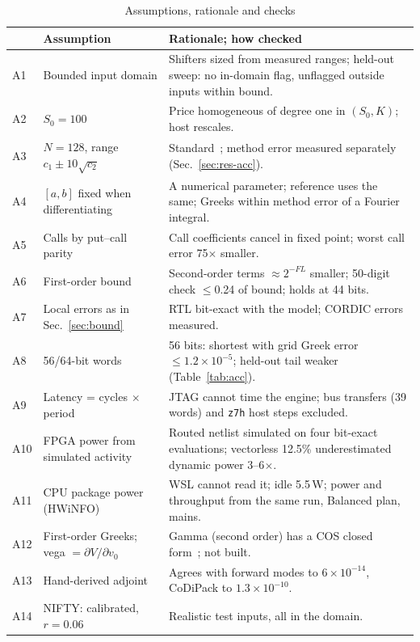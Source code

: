 \documentclass[conference]{IEEEtran}
\begin{document}
\begin{table}[!t]
\centering
\caption{Assumptions, rationale and checks}
\label{tab:assumptions}
\scriptsize
\setlength{\tabcolsep}{2pt}
\begin{tabular}{@{}L{0.42cm}L{2.55cm}L{4.95cm}@{}}
\toprule
& \textbf{Assumption} & \textbf{Rationale; how checked}\\
\midrule
A1 & Bounded input domain & Shifters sized from measured ranges; held-out sweep: no in-domain flag, unflagged outside inputs within bound.\\
A2 & $S_0=100$ & Price homogeneous of degree one in $(S_0,K)$; host rescales.\\
A3 & $N{=}128$, range $c_1\pm10\sqrt{c_2}$ & Standard~\cite{fang}; method error measured separately (Sec.~\ref{sec:res-acc}).\\
A4 & $[a,b]$ fixed when differentiating & A numerical parameter; reference uses the same; Greeks within method error of a Fourier integral.\\
A5 & Calls by put--call parity & Call coefficients cancel in fixed point; worst call error 75$\times$ smaller.\\
A6 & First-order bound & Second-order terms $\approx2^{-FL}$ smaller; 50-digit check $\le$0.24 of bound; holds at 44 bits.\\
A7 & Local errors as in Sec.~\ref{sec:bound} & RTL bit-exact with the model; CORDIC errors measured.\\
A8 & 56/64-bit words & 56 bits: shortest with grid Greek error $\le1.2\times10^{-5}$; held-out tail weaker (Table~\ref{tab:acc}).\\
A9 & Latency = cycles $\times$ period & JTAG cannot time the engine; bus transfers (39 words) and \texttt{z7h} host steps excluded.\\
A10 & FPGA power from simulated activity & Routed netlist simulated on four bit-exact evaluations; vectorless 12.5\% underestimated dynamic power 3--6$\times$.\\
A11 & CPU package power (HWiNFO) & WSL cannot read it; idle 5.5\,W; power and throughput from the same run, Balanced plan, mains.\\
A12 & First-order Greeks; vega $=\partial V/\partial v_0$ & Gamma (second order) has a COS closed form~\cite{fang}; not built.\\
A13 & Hand-derived adjoint & Agrees with forward modes to $6\times10^{-14}$, CoDiPack to $1.3\times10^{-10}$.\\
A14 & NIFTY: calibrated, $r=0.06$ & Realistic test inputs, all in the domain.\\
\bottomrule
\end{tabular}
\end{table}
\end{document}

